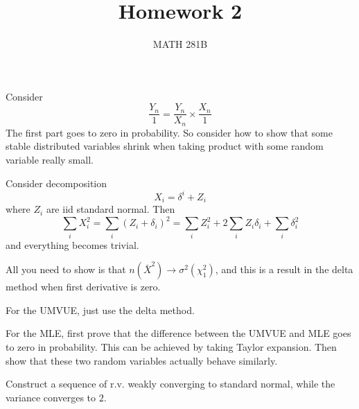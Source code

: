 \documentclass[12pt]{article}
\newcommand{\1}{\mathbbm{1}}
\newenvironment{exercise}[2][Exercise]{\begin{trivlist}
\item[\hskip \labelsep {\bfseries #1}\hskip \labelsep {\bfseries #2.}]}{\end{trivlist}}
\begin{document}
\title{Homework 2}%
\author{MATH 281B} %
\maketitle
\begin{exercise}{$X_n = O_p (1)$, $Y_n = o_p (X_n)$, prove $Y_n = o_p(1)$}
\end{exercise}

Consider
$$
\frac{Y_n}{1 } = \frac{Y_n}{X_n} \times \frac{X_n}{1}
$$
The first part goes to zero in probability. So consider how to show that some stable distributed variables shrink when taking product with some random variable really small.

\begin{exercise}{Noncentral $\chi^2$ has mean $n+\lambda$, variance $2n+4\lambda$}
\end{exercise}

Consider decomposition
$$
X_i = \delta^i + Z_i
$$
where $Z_i$ are iid standard normal. Then 
$$
\sum_i X_i^2 = \sum_i (Z_i + \delta_i)^2 = \sum_i Z_i^2 + 2\sum_i Z_i \delta_i + \sum_i \delta_i^2
$$
and everything becomes trivial.

\begin{exercise}{$n(\bar{X}^2 -\sigma^2/n  ) \rightarrow \sigma^2( \chi^2_1 -1)$ }
\end{exercise}

All you need to show is that $n(\bar{X}^2  ) \rightarrow \sigma^2( \chi^2_1 ) $, and this is a result in the delta method when first derivative is zero.

\begin{exercise}{Compare the MLE and UMVUE of $\lambda e^-\lambda$ in Poisson model}
\end{exercise}

For the UMVUE, just use the delta method.

For the MLE, first prove that the difference between the UMVUE and MLE goes to zero in probability. This can be achieved by taking Taylor expansion. Then show that these two random variables actually behave similarly.

\begin{exercise}{}
Construct a sequence of r.v. weakly converging to standard normal, while the variance converges to $2$.
\end{exercise}
\end{document}
